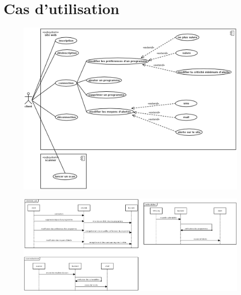 \section{Cas d’utilisation}
\begin{figure}[]
  \includegraphics[width=18cm]{uml1.png}
\end{figure}
\begin{figure}[]
  \includegraphics[width=18cm]{uml2.png}
\end{figure}
